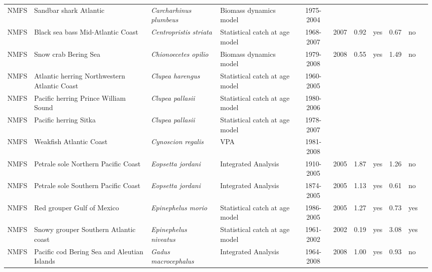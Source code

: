 \begin{longtable}{p{1.8cm}p{3.5cm}p{3.5cm}p{3cm}cccp{0.9cm}cp{0.9cm}c}
  NMFS & Sandbar shark Atlantic & \textit{Carcharhinus plumbeus} & Biomass dynamics model & 1975-2004 &  &  &  &  &  & \cite{LargeCoastalAtl2006-SEFSC.pdf} \\ 
  NMFS & Black sea bass Mid-Atlantic Coast & \textit{Centropristis striata} & Statistical catch at age model & 1968-2007 & 2007 & 0.92 & yes & 0.67 & no & \cite{DataPoorReviewPanelReportFinal-1-20-09.pdf} \\ 
  NMFS & Snow crab Bering Sea & \textit{Chionoecetes opilio} & Biomass dynamics model & 1979-2008 & 2008 & 0.55 & yes & 1.49 & no & \cite{CRABSAFE2008.pdf} \\ 
  NMFS & Atlantic herring Northwestern Atlantic Coast & \textit{Clupea harengus} & Statistical catch at age model & 1960-2005 &  &  &  &  &  & \cite{Herring2006.pdf} \\ 
  NMFS & Pacific herring Prince William Sound & \textit{Clupea pallasii} & Statistical catch at age model & 1980-2006 &  &  &  &  &  & \cite{Hulson-etal-2008-ICESJM.pdf} \\ 
  NMFS & Pacific herring Sitka & \textit{Clupea pallasii} & Statistical catch at age model & 1978-2007 &  &  &  &  &  & \cite{Hulson-etal-2008-ICESJM.pdf} \\ 
  NMFS & Weakfish Atlantic Coast & \textit{Cynoscion regalis} & VPA & 1981-2008 &  &  &  &  &  & \cite{NEFSC-Weakfish-2009.pdf} \\ 
  NMFS & Petrale sole Northern Pacific Coast & \textit{Eopsetta jordani} & Integrated Analysis & 1910-2005 & 2005 & 1.87 & yes & 1.26 & no & \cite{ref2004-SAFE-WCpetralesole.pdf} \\ 
  NMFS & Petrale sole Southern Pacific Coast & \textit{Eopsetta jordani} & Integrated Analysis & 1874-2005 & 2005 & 1.13 & yes & 0.61 & no & \cite{ref2004-SAFE-WCpetralesole.pdf} \\ 
  NMFS & Red grouper Gulf of Mexico & \textit{Epinephelus morio} & Statistical catch at age model & 1986-2005 & 2005 & 1.27 & yes & 0.73 & yes & \cite{JENSEN-RGROUPGM-2006.pdf} \\ 
  NMFS & Snowy grouper Southern Atlantic coast & \textit{Epinephelus niveatus} & Statistical catch at age model & 1961-2002 & 2002 & 0.19 & yes & 3.08 & yes & \cite{ref2004-SEDAR-deepwatersnappergrouper.pdf} \\ 
  NMFS & Pacific cod Bering Sea and Aleutian Islands & \textit{Gadus macrocephalus} & Integrated Analysis & 1964-2008 & 2008 & 1.00 & yes & 0.93 & no & \cite{AFSC-PCODBSAI-2008-Pacific-cod-BSAI.pdf} \\ 

\end{longtable}
